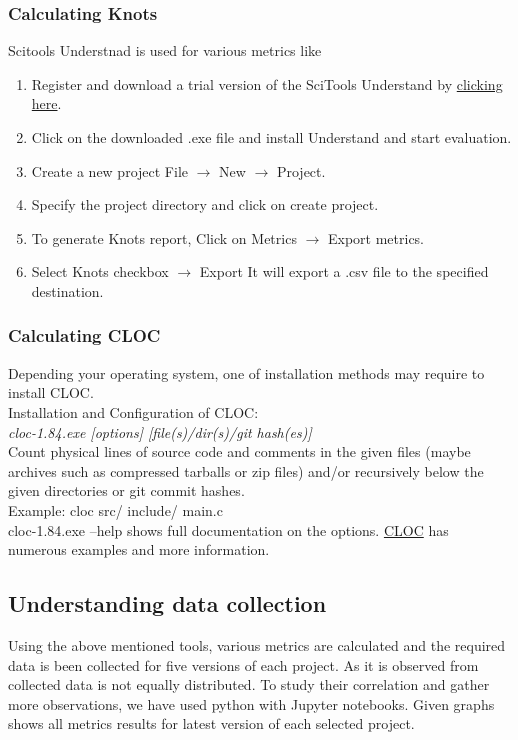 \documentclass[letterpaper, 12 pt, conference]{ieeetran}  %
\begin{document}
\subsubsection{Calculating Knots}
Scitools Understnad is used for various metrics like 
\begin{enumerate}[i]
    \item Register and download a trial version of the SciTools Understand by \href{https://scitools.com/trial-download-3/}{clicking here}\cite{scitoolUnderstnad}.
    \item Click on the downloaded .exe file and install Understand and start evaluation.
    \item Create a new project File $\rightarrow$ New 	$\rightarrow$ Project.
    \item Specify the project directory and click on create project.
    \item To generate Knots report, Click on Metrics 	$\rightarrow$ Export metrics.
    \item Select Knots checkbox 	$\rightarrow$ Export It will export a .csv file to the specified destination.
\end{enumerate}

\subsubsection{Calculating CLOC}
Depending your operating system, one of installation methods may require to install CLOC\cite{cloc}.\\
Installation and Configuration of CLOC:\\
\textit{cloc-1.84.exe [options] [file(s)/dir(s)/git hash(es)]} \\
Count physical lines of source code and comments in the given files (maybe archives such as compressed tarballs or zip files) and/or recursively below the given directories or git commit hashes. \\
Example: cloc src/ include/ main.c \\
cloc-1.84.exe --help shows full documentation on the options. \href{ https://github.com/AlDanial/cloc}{CLOC} has numerous examples and more information.
\medskip

\subsection{Understanding data collection}
Using the above mentioned tools, various metrics are calculated and the required data is been collected for five versions of each project.
As it is observed from collected data is not equally distributed. To study their correlation and gather more observations, we have used python with Jupyter notebooks.
Given graphs shows all metrics results for latest version of each selected project.
\end{document}
